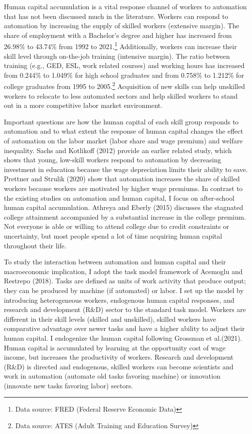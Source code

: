 \documentclass[12pt]{article}
\begin{document}
Human capital accumulation is a vital response channel of workers to automation that has not been discussed much in the literature. Workers can respond to automation by increasing the supply of skilled workers (extensive margin). The share of employment with a Bachelor's degree and higher has increased from 26.98\% to 43.74\% from 1992 to 2021.\footnote{Data source: FRED (Federal Reserve Economic Data)} Additionally, workers can increase their skill level through on-the-job training (intensive margin). The ratio between training (e.g., GED, ESL, work related courses) and working hours has increased from 0.244\% to 1.049\% for high school graduates and from 0.758\% to 1.212\% for college graduates from 1995 to 2005.\footnote{Data source: ATES (Adult Training and Education Survey)} Acquisition of new skills can help unskilled workers to relocate to less automated sectors and help skilled workers to stand out in a more competitive labor market environment. 

Important questions are how the human capital of each skill group responds to automation and to what extent the response of human capital changes the effect of automation on the labor market (labor share and wage premium) and welfare inequality. Sachs and Kotlikoff (2012)\nocite{SachsKotlikoff2012} provide an earlier related study, which shows that young, low-skill workers respond to automation by decreasing investment in education because the wage depreciation limits their ability to save. Prettner and Strulik (2020)\nocite{PrettnerStrulik2020} show that automation increases the share of skilled workers because workers are motivated by higher wage premiums. In contrast to the existing studies on automation and human capital, I focus on after-school human capital accumulation. Athreya and Eberly (2015)\nocite{AthreyaEberly2015} discusses the stagnated college attainment accompanied by a substantial increase in the college premium. Not everyone is able or willing to attend college due to credit constraints or uncertainty, but most people spend a lot of time acquiring human capital throughout their life.

To study the interaction between automation and human capital and their macroeconomic implication, I adopt the task model framework of Acemoglu and Restrepo (2018)\nocite{AcemogluRestrepo2018}. Tasks are defined as units of work activity that produce output; they can be produced by machine (if automated) or labor. I set up the model by introducing heterogeneous workers, endogenous human capital responses, and research and development (R\&D) sector to the standard task model. Workers are different in their skill levels (skilled and unskilled), skilled workers have comparative advantage over newer tasks and have a higher ability to adjust their human capital. I endogenize the human capital following Grossman et al.(2021)\nocite{Grossmanetal2021}. Human capital is accumulated by learning at the opportunity cost of wage income, but increases the productivity of workers. Research and development (R\&D) is directed and endogenous, skilled workers can become scientists and work in automation (automate old tasks favoring machine) or innovation (innovate new tasks favoring labor) sectors. 
\end{document}
